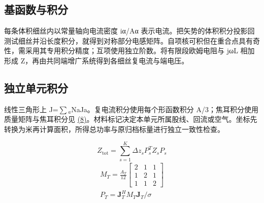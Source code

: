 \documentclass[journal,10pt]{IEEEtran}
\begin{document}
\subsection*{基函数与积分}
\hypertarget{S1.peec_derivation.heading}{}
每条体积细丝内以常量轴向电流密度 iα/Aα 表示电流。把矢势的体积积分投影回测试细丝并沿长度积分，就得到对称部分电感矩阵。自项核可积但在重合点具有奇性，需采用其专用积分精度；互项使用独立阶数。将有限段欧姆电阻与 jωL 相加形成 Z，再由共同端增广系统得到各细丝复电流与端电压。


\subsection*{独立单元积分}
\hypertarget{S1.triangle_derivation.heading}{}
线性三角形上 J=\(\sum\)\(_a\)NaJa。复电流积分使用每个形函数积分 A/3；焦耳积分使用质量矩阵与焦耳积分见 \href{paper_zh-CN_ieee.pdf#E09}{(8)}。材料标记决定本单元所属股线、回流或空气。坐标先转换为米再计算面积，所得总功率与原归档标量进行独立一致性检查。


\hypertarget{E06}{}\begin{equation}Z_{\mathrm{tot}}=\sum_{s=1}^{K}\Delta z_s P_s^T Z_s P_s\tag{7}\label{eq:E06}\end{equation}
\hypertarget{E09}{}
\begin{equation}
\begin{gathered}
M_T=\frac{A_T}{12}\begin{bmatrix}2&1&1\\1&2&1\\1&1&2\end{bmatrix} \\
P_T=\mathbf J_T^H M_T\mathbf J_T/\sigma
\end{gathered}
\tag{8}\label{eq:E09}
\end{equation}
\end{document}
